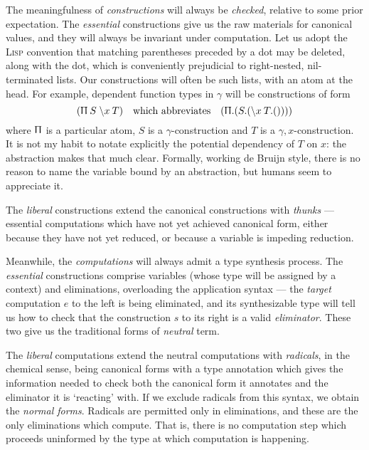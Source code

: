 \documentclass{jfp1}
\begin{document}
\newcommand{\PI}[3]{(\Uppi\:#1\;\la{#2}{#3})}
The meaningfulness of \emph{constructions} will always be
\emph{checked}, relative to some prior expectation. The
\emph{essential} constructions give us the raw materials for
canonical values, and they will always be invariant under computation.
Let us adopt the \textsc{Lisp} convention that matching parentheses
preceded by a dot may be deleted, along with the dot, which is
conveniently prejudicial to right-nested, nil-terminated lists. Our
constructions will often be such lists, with an atom at the head.
For example, dependent function types in $\gamma$ will be constructions of form
\[\PI {S}x{T}\quad
  \mbox{which abbreviates}\quad
  (\Uppi.(S.(\la x T.())))
\]
where $\Uppi$ is a particular atom, $S$ is a $\gamma$-construction and
$T$ is a $\gamma,x$-construction. It is not my habit to notate
explicitly the potential dependency of $T$ on $x$: the abstraction
makes that much clear. Formally, working de Bruijn style, there is no reason
to name the variable bound by an abstraction, but humans seem to appreciate it.

The \emph{liberal} constructions extend the canonical constructions
with \emph{thunks} --- essential computations which have not yet achieved canonical
form, either because they have not yet reduced, or because a variable
is impeding reduction.

Meanwhile, the \emph{computations} will always admit a type synthesis
process. The \emph{essential} constructions comprise variables (whose
type will be assigned by a context) and eliminations, overloading the
application syntax --- the \emph{target} computation $e$ to the left is being
eliminated, and its synthesizable
type will tell us how to check that the construction $s$ to its right
is a valid \emph{eliminator}. These two give us the traditional forms
of \emph{neutral} term.

The \emph{liberal} computations extend the neutral computations with
\emph{radicals}, in the chemical sense, being canonical forms with a
type annotation which gives the information needed to check both the
canonical form it annotates and the eliminator it is `reacting' with.
If we exclude radicals from this syntax, we obtain the \emph{normal
  forms}. Radicals are permitted only in eliminations, and these are
the only eliminations which compute. That is, there is no computation
step which proceeds uninformed by the type at which computation is
happening.
\end{document}
